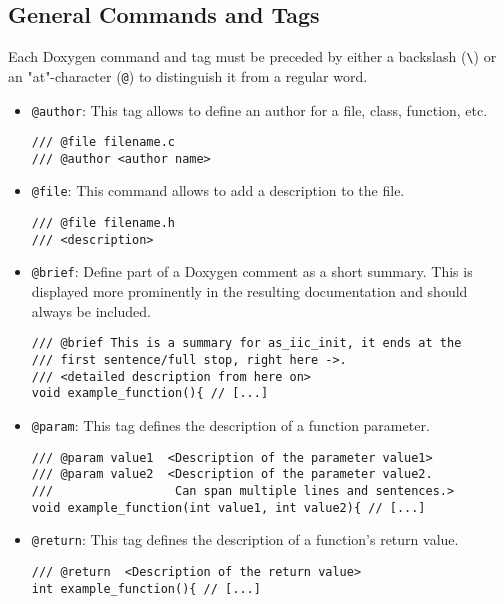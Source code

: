 \clearpage

\subsection{General Commands and Tags}

Each Doxygen command and tag must be preceded by either a backslash (\texttt{\textbackslash}) or an "at"-character (\texttt{@}) to distinguish it from a regular word.

\begin{itemize}
\item \texttt{@author}: This tag allows to define an author for a file, class, function, etc.
\begin{lstlisting}[style=CStyle]
/// @file filename.c
/// @author <author name>
\end{lstlisting}

\item \texttt{@file}: This command allows to add a description to the file.
\begin{lstlisting}[style=CStyle]
/// @file filename.h
/// <description>
\end{lstlisting}

\item \texttt{@brief}: Define part of a Doxygen comment as a short summary. This is displayed more prominently in the resulting documentation and should always be included.
\begin{lstlisting}[style=CStyle]
/// @brief This is a summary for as_iic_init, it ends at the 
/// first sentence/full stop, right here ->.
/// <detailed description from here on>
void example_function(){ // [...] 
\end{lstlisting}

\item \texttt{@param}: This tag defines the description of a function parameter.
\begin{lstlisting}[style=CStyle]
/// @param value1  <Description of the parameter value1>
/// @param value2  <Description of the parameter value2.
///                 Can span multiple lines and sentences.>
void example_function(int value1, int value2){ // [...]
\end{lstlisting}

\item \texttt{@return}: This tag defines the description of a function's return value.
\begin{lstlisting}[style=CStyle]
/// @return  <Description of the return value>
int example_function(){ // [...]
\end{lstlisting}


\end{itemize}
